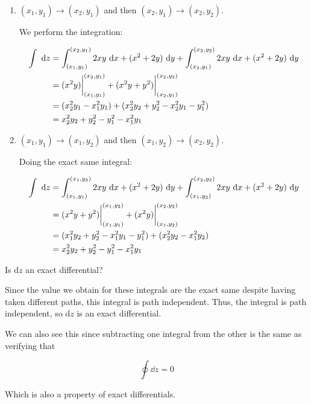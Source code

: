\documentclass{article}
\begin{document}
    \begin{enumerate}[i]
        \item $(x_1, y_1) \to (x_2, y_1)$ and then $(x_2, y_1) \to (x_2, y_2)$.
        
        \begin{solution}
            We perform the integration:
    
            \begin{align*}
                \int \ \mathrm d z &= \int_{(x_1, y_1)}^{(x_2, y_1)} 2xy \ \mathrm d x + (x^2 + 2y) \ \mathrm d y + \int_{(x_2, y_1)}^{(x_2, y_2)} 2xy \ \mathrm d x + (x^2 + 2y) \ \mathrm d y\\
                &= (x^2y)\bigg|_{(x_1, y_1)}^{(x_2, y_1)} + (x^2y + y^2)\bigg|_{(x_2, y_1)}^{(x_2, y_2)}\\
                &= (x_2^2y_1 - x_1^2y_1) + (x_2^2y_2 + y_2^2 - x_2^2y_1 - y_1^2)\\
                &= x_2^2y_2 + y_2^2- y_1^2 - x_1^2y_1
            \end{align*}
        \end{solution}
        \item $(x_1, y_1) \to (x_1, y_2)$ and then $(x_1, y_2) \to (x_2, y_2)$. 
        
        \begin{solution}
            Doing the exact same integral:

            \begin{align*}
                \int \ \mathrm d z &= \int_{(x_1, y_1)}^{(x_1, y_2)} 2xy \ \mathrm d x + (x^2 + 2y) \ \mathrm d y + \int_{(x_1, y_2)}^{(x_2, y_2)} 2xy \ \mathrm d x + (x^2 + 2y) \ \mathrm d y\\
                &= (x^2y + y^2)\bigg|_{(x_1, y_1)}^{(x_1, y_2)} + (x^2y)\bigg|_{(x_1, y_2)}^{(x_2, y_2)}\\
                &= (x_1^2y_2 + y_2^2 - x_1^2y_1 - y_1^2) + (x_2^2y_2 - x_1^2y_2)\\ 
                &= x_2^2y_2 + y_2^2- y_1^2 - x_1^2y_1
            \end{align*}
        \end{solution}
    \end{enumerate}

    Is $\mathrm{d}z$ an exact differential?

    \begin{solution}
        Since the value we obtain for these integrals are the exact same despite having taken different paths, this integral is path independent. Thus, the integral is path independent, so $\mathrm dz$ is an exact differential. 

        We can also see this since subtracting one integral from the other is the same as verifying that

        \[ \oint \dd z = 0\]

        Which is also a property of exact differentials.
    \end{solution}
    \pagebreak
\end{document}
